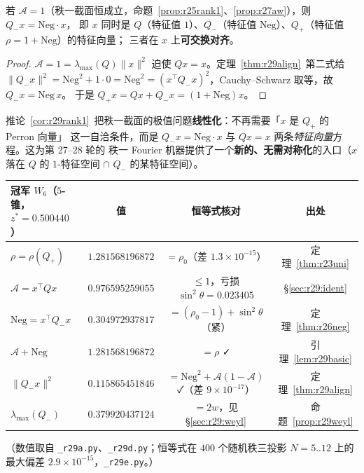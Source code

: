 \begin{corollary}[秩一截面的共享特征向量刚性，已证]\label{cor:r29rank1}
若 $\mathcal A=1$（秩一截面恒成立，命题~\ref{prop:r25rank1}、\ref{prop:r27aw}），则 $Q_-x=\mathrm{Neg}\cdot x$，
即 $x$ 同时是 $Q$（特征值 $1$）、$Q_-$（特征值 $\mathrm{Neg}$）、$Q_+$（特征值 $\rho=1+\mathrm{Neg}$）的特征向量；
三者在 $x$ 上\textbf{可交换对齐}。
\end{corollary}
\begin{proof}
$\mathcal A=1=\lambda_{\max}(Q)\|x\|^2$ 迫使 $Qx=x$。定理~\ref{thm:r29align}~第二式给
$\|Q_-x\|^2=\mathrm{Neg}^2+1\cdot0=\mathrm{Neg}^2=(x^\top Q_-x)^2$，Cauchy--Schwarz 取等，故 $Q_-x=\mathrm{Neg}\,x$。
于是 $Q_+x=Qx+Q_-x=(1+\mathrm{Neg})x$。
\end{proof}
\begin{remark}
推论~\ref{cor:r29rank1}~把秩一截面的极值问题\textbf{线性化}：不再需要「$x$ 是 $Q_+$ 的 Perron 向量」
这一自洽条件，而是 $Q_-x=\mathrm{Neg}\cdot x$ 与 $Qx=x$ 两条\emph{特征向量}方程。这为第 27--28 轮的
秩一 Fourier 机器提供了一个\textbf{新的、无需对称化}的入口（$x$ 落在 $Q$ 的 $1$-特征空间 $\cap$ $Q_-$ 的某特征空间）。
\end{remark}

\begin{center}\small
\begin{tabular}{lccc}
\toprule
冠军 $W_6$（$5$-锥，$z^*=0.500440$）& 值 & 恒等式核对 & 出处\\
\midrule
$\rho=\rho(Q_+)$ & $1.281568196872$ & $=\rho_0$（差 $1.3\times10^{-15}$）& 定理~\ref{thm:r23uni}\\
$\mathcal A=x^\top Qx$ & $0.976595259055$ & $\le1$，亏损 $\sin^2\theta=0.023405$ & \S\ref{sec:r29:ident}\\
$\mathrm{Neg}=x^\top Q_-x$ & $0.304972937817$ & $=(\rho_0-1)+\sin^2\theta$（紧）& 定理~\ref{thm:r26neg}\\
$\mathcal A+\mathrm{Neg}$ & $1.281568196872$ & $=\rho$ ✓ & 引理~\ref{lem:r29basic}\\
$\|Q_-x\|^2$ & $0.115865451846$ & $=\mathrm{Neg}^2+\mathcal A(1-\mathcal A)$ ✓（差 $9\times10^{-17}$）& 定理~\ref{thm:r29align}\\
$\lambda_{\max}(Q_-)$ & $0.379920437124$ & $=2w$，见 \S\ref{sec:r29:weyl} & 命题~\ref{prop:r29weyl}\\
\bottomrule
\end{tabular}
\end{center}
（数值取自 \texttt{\_r29a.py}、\texttt{\_r29d.py}；恒等式在 $400$ 个随机秩三投影 $N=5..12$ 上的最大偏差
$2.9\times10^{-15}$，\texttt{\_r29e.py}。）


